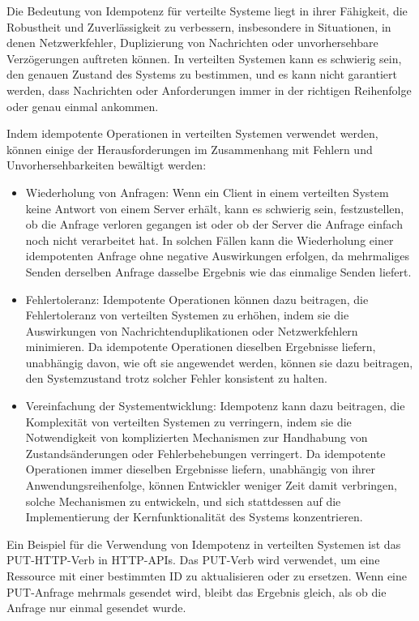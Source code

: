 Die Bedeutung von Idempotenz für verteilte Systeme liegt in ihrer Fähigkeit, die Robustheit und Zuverlässigkeit zu verbessern, insbesondere in Situationen, in denen Netzwerkfehler, Duplizierung von Nachrichten oder unvorhersehbare Verzögerungen auftreten können. In verteilten Systemen kann es schwierig sein, den genauen Zustand des Systems zu bestimmen, und es kann nicht garantiert werden, dass Nachrichten oder Anforderungen immer in der richtigen Reihenfolge oder genau einmal ankommen.

Indem idempotente Operationen in verteilten Systemen verwendet werden, können einige der Herausforderungen im Zusammenhang mit Fehlern und Unvorhersehbarkeiten bewältigt werden:
\begin{itemize}
\item Wiederholung von Anfragen: Wenn ein Client in einem verteilten System keine Antwort von einem Server erhält, kann es schwierig sein, festzustellen, ob die Anfrage verloren gegangen ist oder ob der Server die Anfrage einfach noch nicht verarbeitet hat. In solchen Fällen kann die Wiederholung einer idempotenten Anfrage ohne negative Auswirkungen erfolgen, da mehrmaliges Senden derselben Anfrage dasselbe Ergebnis wie das einmalige Senden liefert.
\item Fehlertoleranz: Idempotente Operationen können dazu beitragen, die Fehlertoleranz von verteilten Systemen zu erhöhen, indem sie die Auswirkungen von Nachrichtenduplikationen oder Netzwerkfehlern minimieren. Da idempotente Operationen dieselben Ergebnisse liefern, unabhängig davon, wie oft sie angewendet werden, können sie dazu beitragen, den Systemzustand trotz solcher Fehler konsistent zu halten.
\item Vereinfachung der Systementwicklung: Idempotenz kann dazu beitragen, die Komplexität von verteilten Systemen zu verringern, indem sie die Notwendigkeit von komplizierten Mechanismen zur Handhabung von Zustandsänderungen oder Fehlerbehebungen verringert. Da idempotente Operationen immer dieselben Ergebnisse liefern, unabhängig von ihrer Anwendungsreihenfolge, können Entwickler weniger Zeit damit verbringen, solche Mechanismen zu entwickeln, und sich stattdessen auf die Implementierung der Kernfunktionalität des Systems konzentrieren.
\end{itemize}

Ein Beispiel für die Verwendung von Idempotenz in verteilten Systemen ist das PUT-HTTP-Verb in HTTP-APIs. Das PUT-Verb wird verwendet, um eine Ressource mit einer bestimmten ID zu aktualisieren oder zu ersetzen. Wenn eine PUT-Anfrage mehrmals gesendet wird, bleibt das Ergebnis gleich, als ob die Anfrage nur einmal gesendet wurde. 


